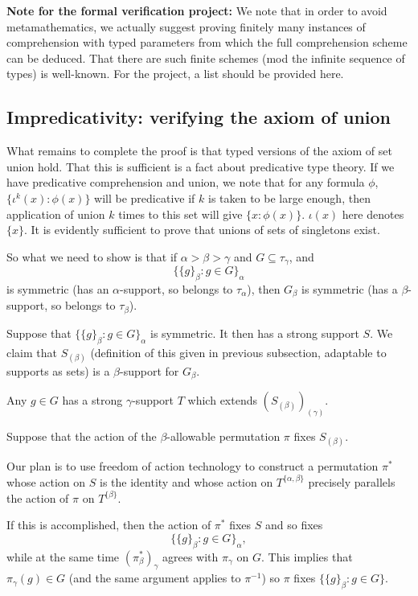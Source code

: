 \documentclass[112pt]{article}
\begin{document}
{\bf Note for the formal verification project:}  We note that in order to avoid metamathematics, we actually suggest proving finitely many instances of comprehension with typed parameters from which the full comprehension scheme can be deduced.  That there are such finite schemes (mod the infinite sequence of types) is well-known.  For the project, a list should be provided here.

\newpage
\subsection{Impredicativity:  verifying the axiom of union}

What remains to complete the proof is that typed versions of the axiom of set union hold.  That this is sufficient is a fact about predicative type theory.
If we have predicative comprehension and union, we note that for any formula $\phi$, $\{\iota^k(x):\phi(x)\}$ will be predicative if $k$ is taken to be large enough, then application of union $k$ times to this set will give $\{x:\phi(x)\}$.  $\iota(x)$ here denotes $\{x\}$.  It is evidently sufficient to prove that unions of sets of singletons exist.

So what we need to show is that if  $\alpha>\beta>\gamma$ and $G \subseteq \tau_\gamma$, and $$\{\{g\}_\beta:g \in G\}_\alpha$$ is symmetric (has an $\alpha$-support, so belongs to $\tau_\alpha$), then $G_\beta$ is symmetric (has a $\beta$-support, so belongs to $\tau_\beta$).

Suppose that $\{\{g\}_\beta:g \in G\}_\alpha$ is symmetric.  It then has a strong support $S$.  We claim that $S_{(\beta)}$ (definition of this given in previous subsection, adaptable to supports as sets) is a $\beta$-support for $G_\beta$.

Any $g \in G$ has a strong $\gamma$-support $T$ which extends $(S_{(\beta)})_{(\gamma)}$. 

Suppose that the action of the $\beta$-allowable permutation $\pi$ fixes $S_{(\beta)}$.

Our plan is to use freedom of action technology to construct a permutation $\pi^*$ whose action on $S$ is the identity
and whose action on $T^{\{\alpha,\beta\}}$ precisely parallels the action of $\pi$ on $T^{\{\beta\}}$.

If this is accomplished, then the action of $\pi^*$ fixes $S$ and so fixes $$\{\{g\}_\beta:g \in G\}_\alpha,$$ while at the same
time $(\pi^*_\beta)_\gamma$ agrees with $\pi_\gamma$ on $G$.  This implies that $\pi_\gamma(g) \in G$ (and the same argument applies to $\pi^{-1}$)
so $\pi$ fixes $\{\{g\}_\beta:g \in G\}$.
\end{document}
